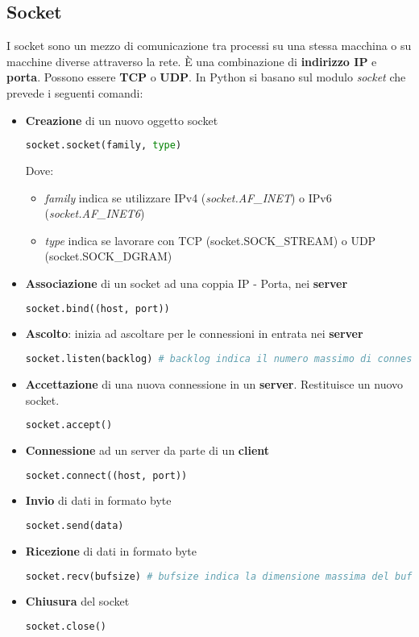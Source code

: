 \subsection{Socket}
I socket sono un mezzo di comunicazione tra processi su una stessa macchina o su macchine diverse attraverso la rete. È una combinazione di \textbf{indirizzo IP} e \textbf{porta}. Possono essere \textbf{TCP} o \textbf{UDP}. In Python si basano sul modulo \textit{socket} che prevede i seguenti comandi:
\begin{itemize}
	\item \textbf{Creazione} di un nuovo oggetto socket
	\begin{lstlisting}[language=Python]
		socket.socket(family, type)
	\end{lstlisting}
	Dove:
	\begin{itemize}
		\item \textit{family} indica se utilizzare IPv4 (\textit{socket.AF\_INET}) o IPv6 (\textit{socket.AF\_INET6})
		\item \textit{type} indica se lavorare con TCP (socket.SOCK\_STREAM) o UDP (socket.SOCK\_DGRAM)
	\end{itemize}
	\item \textbf{Associazione} di un socket ad una coppia IP - Porta, nei \textbf{server}
	\begin{lstlisting}[language=Python]
		socket.bind((host, port))
	\end{lstlisting}
	\item \textbf{Ascolto}: inizia ad ascoltare per le connessioni in entrata nei \textbf{server}
	\begin{lstlisting}[language=Python]
		socket.listen(backlog) # backlog indica il numero massimo di connessioni in coda
	\end{lstlisting}
	\item \textbf{Accettazione} di una nuova connessione in un \textbf{server}. Restituisce un nuovo socket.
	\begin{lstlisting}[language=Python]
		socket.accept()
	\end{lstlisting}
	\item \textbf{Connessione} ad un server da parte di un \textbf{client}
	\begin{lstlisting}[language=Python]
		socket.connect((host, port))
	\end{lstlisting}
	\item \textbf{Invio} di dati in formato byte
	\begin{lstlisting}[language=Python]
		socket.send(data)
	\end{lstlisting}
	\item \textbf{Ricezione} di dati in formato byte
	\begin{lstlisting}[language=Python]
		socket.recv(bufsize) # bufsize indica la dimensione massima del buffer di ricezione
	\end{lstlisting}
	\item \textbf{Chiusura} del socket
	\begin{lstlisting}[language=Python]
		socket.close()
	\end{lstlisting}
\end{itemize}